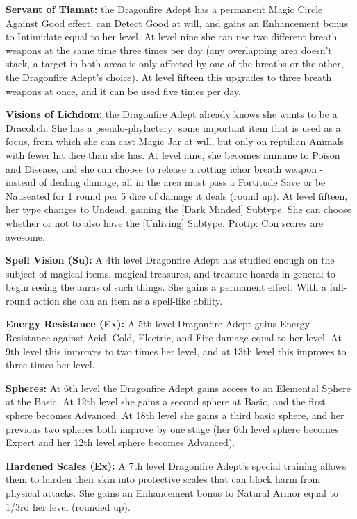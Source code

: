 \begin{itemize*}
\item \textbf{Servant of Tiamat:} the Dragonfire Adept has a permanent Magic Circle Against Good effect, can Detect Good at will, and gains an Enhancement bonus to Intimidate equal to her level. At level nine she can use two different breath weapons at the same time three times per day (any overlapping area doesn't stack, a target in both areas is only affected by one of the breaths or the other, the Dragonfire Adept's choice). At level fifteen this upgrades to three breath weapons at once, and it can be used five times per day.
\item \textbf{Visions of Lichdom:} the Dragonfire Adept already knows she wants to be a Dracolich. She has a pseudo-phylactery: some important item that is used as a focus, from which she can cast Magic Jar at will, but only on reptilian Animals with fewer hit dice than she has. At level nine, she becomes immune to Poison and Disease, and she can choose to release a rotting ichor breath weapon - instead of dealing damage, all in the area must pass a Fortitude Save or be Nauseated for 1 round per 5 dice of damage it deals (round up). At level fifteen, her type changes to Undead, gaining the [Dark Minded] Subtype. She can choose whether or not to also have the [Unliving] Subtype. Protip: Con scores are awesome.
\end{itemize*}

\textbf{Spell Vision (Su):} A 4th level Dragonfire Adept has studied enough on the subject of magical items, magical treasures, and treasure hoards in general to begin seeing the auras of such things. She gains a permanent  effect. With a full-round action she can  an item as a spell-like ability.

\textbf{Energy Resistance (Ex):} A 5th level Dragonfire Adept gains Energy Resistance against Acid, Cold, Electric, and Fire damage equal to her level. At 9th level this improves to two times her level, and at 13th level this improves to three times her level.

\textbf{Spheres:} At 6th level the Dragonfire Adept gains access to an Elemental Sphere at the Basic. At 12th level she gains a second sphere at Basic, and the first sphere becomes Advanced. At 18th level she gains a third basic sphere, and her previous two spheres both improve by one stage (her 6th level sphere becomes Expert and her 12th level sphere becomes Advanced).

\textbf{Hardened Scales (Ex):} A 7th level Dragonfire Adept's special training allows them to harden their skin into protective scales that can block harm from physical attacks. She gains an Enhancement bonus to Natural Armor equal to 1/3rd her level (rounded up).

